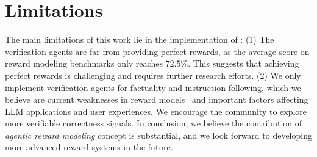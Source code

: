 \section*{Limitations}

The main limitations of this work lie in the implementation of \ourmethod: (1) The verification agents are far from providing perfect rewards, as the average score on reward modeling benchmarks only reaches $72.5\%$. This suggests that achieving perfect rewards is challenging and requires further research efforts. (2) We only implement verification agents for factuality and instruction-following, which we believe are current weaknesses in reward models~\citep{liu2024rm} and important factors affecting LLM applications and user experiences. We encourage the community to explore more verifiable correctness signals. In conclusion, we believe the contribution of \textit{agentic reward modeling} concept is substantial, and we look forward to developing more advanced reward systems in the future.
